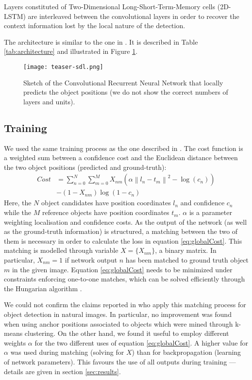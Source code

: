 \documentclass[conference]{IEEEtran}
\begin{document}
Layers constituted of Two-Dimensional Long-Short-Term-Memory cells (2D-LSTM) \cite{Graves2DLSTM2009} are interleaved between the convolutional layers in order to recover the context information lost by the local nature of the detection.

The architecture is similar to the one in \cite{moysset2016learning}. It is described in Table \ref{tab:architecture} and illustrated in Figure \ref{fig:archi}.

\begin{figure}[!t]
  \centering
  \texttt{[image: teaser-sdl.png]}
  \caption{Sketch of the Convolutional Recurrent Neural Network that locally predicts the object positions (we do not show the correct numbers of layers and units).}
  \label{fig:archi}
\end{figure}

\subsection{Training}
We used the same training process as the one described in \cite{erhan2014scalable}. The cost function is a weighted sum between a confidence cost and the Euclidean distance between the two object positions (predicted and ground-truth):
\begin{equation}
\label{eq:globalCost}
\begin{split}
Cost & = \sum_{n=0}^N \sum_{m=0}^M X_{nm} \left( \alpha \left\|l_{n}-t_{m}\right\|^2 - \log(c_{n})\right) \\
 & - (1 - X_{nm}) \log(1-c_{n})
\end{split}
\end{equation}
Here, the $N$ object candidates have position coordinates $l_{n}$ and confidence $c_{n}$ while the $M$ reference objects have position coordinates $t_{m}$. $\alpha$ is a parameter weighting localisation and confidence costs.  As the output of the network (as well as the ground-truth information) is structured, a matching between the two of them is necessary in order to calculate the loss in equation \ref{eq:globalCost}. This matching is modelled through variable $X{=}\{X_{nm}\}$, a binary matrix. In particular, $X_{nm}{=}1$ if network output $n$ has been matched to ground truth object $m$ in the given image. Equation \ref{eq:globalCost} needs to be minimized under constraints enforcing one-to-one matches, which can be solved efficiently through the Hungarian algorithm \cite{munkres1957algorithms}.

We could not confirm the claims reported in \cite{erhan2014scalable} who apply this matching process for object detection in natural images. In particular, no improvement was found when using anchor positions associated to  objects which were mined through k-means clustering. On the other hand, we found it useful to employ different weights $\alpha$ for the two different uses of equation \ref{eq:globalCost}. A higher value for $\alpha$ was used during matching (solving for $X$) than for backpropagation (learning of network parameters). This favours the use of all outputs during training --- details are given in section \ref{sec:results}.
\end{document}
